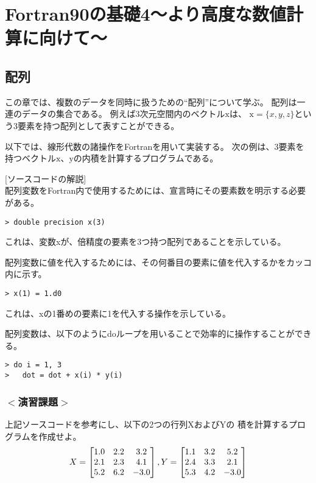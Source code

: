 \chapter{Fortran90の基礎4〜より高度な数値計算に向けて〜}


\section{配列}
この章では、複数のデータを同時に扱うための``配列''について学ぶ。
配列は一連のデータの集合である。
例えば3次元空間内のベクトル$\mathrm{x}$は、
$\mathrm{x}=\{x, y, z\}$という3要素を持つ配列として表すことができる。

以下では、線形代数の諸操作をFortranを用いて実装する。
次の例は、3要素を持つベクトル$\mathrm{x}$、$\mathrm{y}$の内積を計算するプログラムである。



[ソースコードの解説]\\
配列変数をFortran内で使用するためには、宣言時にその要素数を明示する必要がある。

\begin{Verbatim}[frame=single]
> double precision x(3)
\end{Verbatim}
これは、変数{\ttfamily x}が、倍精度の要素を3つ持つ配列であることを示している。

配列変数に値を代入するためには、その何番目の要素に値を代入するかをカッコ内に示す。
\begin{Verbatim}[frame=single]
> x(1) = 1.d0
\end{Verbatim}
これは、{\ttfamily x}の1番めの要素に1を代入する操作を示している。

配列変数は、以下のように{\ttfamily do}ループを用いることで効率的に操作することができる。
\begin{Verbatim}[frame=single]
> do i = 1, 3
>   dot = dot + x(i) * y(i)
\end{Verbatim}

\subsection*{$<$演習課題$>$}
上記ソースコードを参考にし、以下の2つの行列$\mathrm{X}$および$\mathrm{Y}$の
積を計算するプログラムを作成せよ。
\begin{equation}
X =
\begin{bmatrix}
  1.0 & 2.2 & 3.2 \\
  2.1 & 2.3 & 4.1 \\
  5.2 & 6.2 & -3.0\\
\end{bmatrix},\\
Y =
\begin{bmatrix}
  1.1 & 3.2 &  5.2 \\
  2.4 & 3.3 &  2.1 \\
  5.3 & 4.2 & -3.0 \\
\end{bmatrix}
\end{equation}

